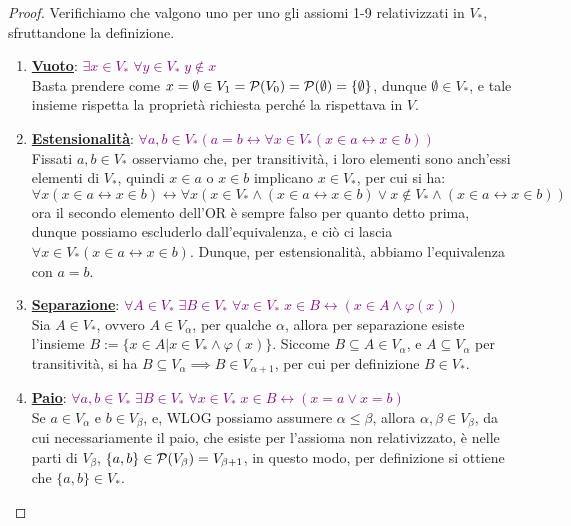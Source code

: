 \begin{proof}
	Verifichiamo che valgono uno per uno gli assiomi 1-9 relativizzati in $V_*$, sfruttandone la definizione.
	\begin{enumerate}[(1)]
		\item \textbf{\underline{Vuoto}}: \textcolor{purple}{$\exists x \in V_* \; \forall y \in V_* \; y \not \in x$} \\
		Basta prendere come $x = \emptyset \in V_1 = \mathcal{P}(V_0) = \mathcal{P}(\emptyset) = \{\emptyset\}$, dunque $\emptyset \in V_*$, e tale insieme rispetta la proprietà richiesta perché la rispettava in $V$.
		\item \textbf{\underline{Estensionalità}}: \textcolor{purple}{$\forall a,b \in V_* (a = b \leftrightarrow \forall x \in V_* (x \in a \leftrightarrow x \in b))$} \\
		Fissati $a,b \in V_*$ osserviamo che, per transitività, i loro elementi sono anch'essi elementi di $V_*$, quindi $x \in a$ o $x \in b$ implicano $x \in V_*$, per cui si ha:
		\[ \forall x (x \in a \leftrightarrow x \in b) \leftrightarrow \forall x (x \in V_* \land (x \in a \leftrightarrow x \in b) \lor x \not \in V_* \land (x \in a \leftrightarrow x \in b))
			\] 
		ora il secondo elemento dell'OR è sempre falso per quanto detto prima, dunque possiamo escluderlo dall'equivalenza, e ciò ci lascia $\forall x \in V_* (x \in a \leftrightarrow x \in b)$.
		Dunque, per estensionalità, abbiamo l'equivalenza con $a = b$.
		\item \textbf{\underline{Separazione}}: \textcolor{purple}{$\forall A \in V_* \; \exists B \in V_* \; \forall x \in V_* \; x \in B \leftrightarrow (x \in A \land \varphi(x))$} \\
		Sia $A \in V_*$, ovvero $A \in V_\alpha$, per qualche $\alpha$, allora per separazione esiste l'insieme $B :=\{x \in A | x \in V_* \land \varphi(x)\}$. Siccome $B \subseteq A \in V_\alpha$, e $A \subseteq V_\alpha$ per transitività, si ha $B \subseteq V_\alpha \implies B \in V_{\alpha + 1}$, per cui per definizione $B \in V_*$.
		\item \textbf{\underline{Paio}}: \textcolor{purple}{$\forall a,b \in V_* \; \exists B \in V_* \; \forall x \in V_* \; x \in B \leftrightarrow (x = a \lor x = b)$} \\
		Se $a \in V_\alpha$ e $b \in V_\beta$, e, WLOG possiamo assumere $\alpha \leq \beta$, allora $\alpha, \beta \in V_\beta$, da cui necessariamente il paio, che esiste per l'assioma non relativizzato, è nelle parti di $V_\beta$, $\{a,b\} \in \mathcal{P}(V_\beta) = V_{\beta + 1}$, in questo modo, per definizione si ottiene che $\{a,b\} \in V_*$.

\end{enumerate}
\end{proof}
